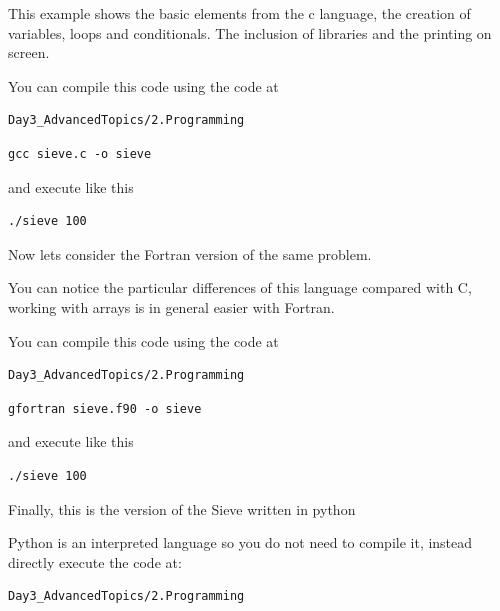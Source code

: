 

This example shows the basic elements from the c language, the creation of variables, loops and conditionals. The inclusion of libraries and the printing on screen.

You can compile this code using the code at 

\begin{lstlisting}
Day3_AdvancedTopics/2.Programming
\end{lstlisting}

\begin{lstlisting}
gcc sieve.c -o sieve
\end{lstlisting}

and execute like this

\begin{lstlisting}
./sieve 100
\end{lstlisting}

Now lets consider the Fortran version of the same problem.



You can notice the particular differences of this language compared with C, working with arrays is in general easier with Fortran.

You can compile this code using the code at 

\begin{lstlisting}
Day3_AdvancedTopics/2.Programming
\end{lstlisting}

\begin{lstlisting}
gfortran sieve.f90 -o sieve
\end{lstlisting}

and execute like this

\begin{lstlisting}
./sieve 100
\end{lstlisting}

Finally, this is the version of the Sieve written in python



Python is an interpreted language so you do not need to compile it, instead directly execute the code at:

\begin{lstlisting}
Day3_AdvancedTopics/2.Programming
\end{lstlisting}

